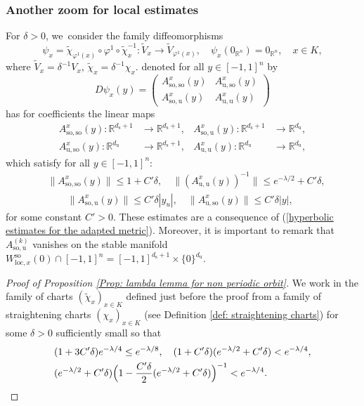 \documentclass[JEP,XML,SOM,Unicode,NoEqCountersInSection,NoFloatCountersInSection,published]{cedram}
\newcommand{\loc}{\mathrm{loc}}
\newcommand{\rs}{\mathrm{s}}
\newcommand{\rso}{\mathrm{so}}
\newcommand{\ru}{\mathrm{u}}
\theoremstyle{definition}
\theoremstyle{plain}
\newcommand{\R}{\mathbb{R}}
\begin{document}
\begin{appendix}
\subsubsection*{Another zoom for local estimates}
For $\delta > 0$, we~consider the family diffeomorphisms
\[
\psi_{x} = \widetilde{\chi}_{\varphi^1 (x)} \circ \varphi^1 \circ \widetilde{\chi}_x^{-1}: \widetilde{V}_x \to \widetilde{V}_{\varphi^1 (x)}, \quad \psi_{x} (0_{\R^n}) = 0_{\R^n}, \quad x \in K,
\]
where $\widetilde{V}_{x}= \delta^{-1} V_x$, $\widetilde{\chi}_x = \delta^{-1} \chi_x$.
denoted for all $y \in [-1,1]^n$ by
\[
D \psi_{x} (y) = \begin{pmatrix}
A_{\rso,\rso}^{x} (y) & A_{\ru,\rso}^{x} (y) \\
A_{\rso,\ru}^{x} (y) & A_{\ru,\ru}^{x} (y)
\end{pmatrix}
\]
has for coefficients the linear maps
\begin{align*}
A_{\rso,\rso}^{x} (y): \R^{d_\rs + 1} &\to \R^{d_\rs + 1},& A_{\rso,\ru}^{x} (y): \R^{d_\rs + 1} &\to \R^{d_\ru},\\
A_{\ru,\rso}^{x} (y): \R^{d_\ru} &\to \R^{d_\rs + 1},& A_{\ru,\ru}^{x} (y): \R^{d_\ru} &\to \R^{d_\ru},
\end{align*}
which satisfy for all $y \in [-1,1]^n$:
\begin{equation}\label{eq: appendix, estimates differential in adapted chart}
\begin{split}
& \| A_{\rso,\rso}^{x} (y) \|\leq 1 + C' \delta, \quad \| (A_{\ru,\ru}^{x} (y))^{-1} \| \leq e^{- \lambda/2} + C' \delta,\\
&\qquad \| A_{\rso,\ru}^{x} (y) \| \leq C' \delta |y_u|, \quad \| A_{\ru,\rso}^{x} (y) \| \leq C' \delta |y|,
\end{split}
\end{equation}
for some constant $C' > 0$. These estimates are a consequence of (\ref{hyperbolic estimates for the adapted metric}). Moreover, it is important to remark that $A_{\rso,\ru}^{(k)}$ vanishes on the stable manifold $W_{\loc,x}^{\rso} (0) \cap [-1,1]^n = [-1,1]^{d_\rs + 1} \times \{0\}^{d_\ru}$.

\begin{proof}[Proof of Proposition \ref{Prop: lambda lemma for non periodic orbit}]
We work in the family of charts $(\widetilde{\chi}_x)_{x \in K}$ defined just before the proof from a family of straightening charts $(\chi_x)_{x \in K}$ (see Definition \ref{def: straightening charts}) for some $\delta > 0$ sufficiently small so that
\begin{equation}\label{eq: estimees delta preuve lambda lemma}
\begin{split}
&(1 + 3 C' \delta) e^{- \lambda / 4} \leq e^{- \lambda /8}, \quad (1 + C' \delta) (e^{- \lambda/2 } + C' \delta) < e^{- \lambda / 4}, \\
&(e^{-\lambda/ 2} + C' \delta) \Bigl(1 - \frac{C' \delta}{2} (e^{- \lambda/ 2} + C' \delta) \Bigr)^{-1} < e^{- \lambda / 4}.
\end{split}
\end{equation}


\end{proof}
\end{appendix}
\end{document}
